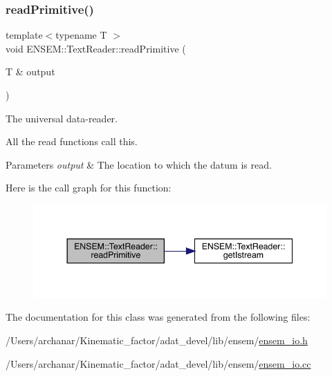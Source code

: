 \subsubsection{\texorpdfstring{readPrimitive()}{readPrimitive()}\hspace{0.1cm}{\footnotesize\ttfamily [2/2]}}
{\footnotesize\ttfamily template$<$typename T $>$ \\
void E\+N\+S\+E\+M\+::\+Text\+Reader\+::read\+Primitive (\begin{DoxyParamCaption}\item[{T \&}]{output }\end{DoxyParamCaption})\hspace{0.3cm}{\ttfamily [protected]}}



The universal data-\/reader. 

All the read functions call this. 
\begin{DoxyParams}{Parameters}
{\em output} & The location to which the datum is read. \\
\hline
\end{DoxyParams}
Here is the call graph for this function\+:\nopagebreak
\begin{figure}[H]
\begin{center}
\leavevmode
\includegraphics[width=344pt]{d4/d23/classENSEM_1_1TextReader_afa5fccab911c19d1365a51f39df01d96_cgraph}
\end{center}
\end{figure}


The documentation for this class was generated from the following files\+:\begin{DoxyCompactItemize}
\item 
/\+Users/archanar/\+Kinematic\+\_\+factor/adat\+\_\+devel/lib/ensem/\mbox{\hyperlink{lib_2ensem_2ensem__io_8h}{ensem\+\_\+io.\+h}}\item 
/\+Users/archanar/\+Kinematic\+\_\+factor/adat\+\_\+devel/lib/ensem/\mbox{\hyperlink{ensem__io_8cc}{ensem\+\_\+io.\+cc}}\end{DoxyCompactItemize}
